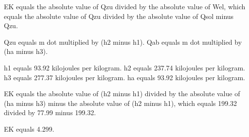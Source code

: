 EK equals the absolute value of Qzu divided by the absolute value of Wel, which equals the absolute value of Qzu divided by the absolute value of Qsol minus Qzu.  

Qzu equals m dot multiplied by (h2 minus h1).  
Qab equals m dot multiplied by (ha minus h3).  

h1 equals 93.92 kilojoules per kilogram.  
h2 equals 237.74 kilojoules per kilogram.  
h3 equals 277.37 kilojoules per kilogram.  
ha equals 93.92 kilojoules per kilogram.  

EK equals the absolute value of (h2 minus h1) divided by the absolute value of (ha minus h3) minus the absolute value of (h2 minus h1), which equals 199.32 divided by 77.99 minus 199.32.  

EK equals 4.299.